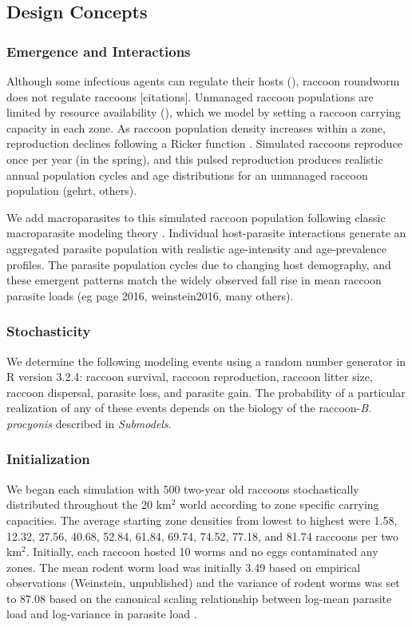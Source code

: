 \documentclass[11pt]{article}
\begin{document}
\subsection{Design Concepts}

\subsubsection{Emergence and Interactions}

Although some infectious agents can regulate their hosts (), raccoon
roundworm does not regulate raccoons [citations]. Unmanaged raccoon populations are
limited by resource availability (), which we model by setting a raccoon
carrying capacity in each zone. As raccoon population density
increases within a zone, reproduction declines following a Ricker function \citep{Gurney1998}. Simulated raccoons
reproduce once per year (in the spring), and this pulsed reproduction
produces realistic annual population cycles and age distributions for an
unmanaged raccoon population (gehrt, others).

We add macroparasites to this simulated raccoon population following
classic macroparasite modeling theory \citep{AndersonandMay1978,Anderson1991,Cornell2010}. Individual host-parasite interactions generate an aggregated
parasite population with realistic age-intensity and age-prevalence
profiles. The parasite population cycles due to
changing host demography, and these emergent patterns match the widely
observed fall rise in mean raccoon parasite loads (eg page 2016,
weinstein2016, many others).

\subsubsection{Stochasticity}

We determine the following modeling events using a random number generator in R version 3.2.4: raccoon survival, raccoon reproduction, raccoon litter size, raccoon dispersal, parasite loss, and parasite gain.  The probability of a particular realization of any of these events depends on the biology of the raccoon-\emph{B. procyonis} described in \emph{Submodels}.

\subsubsection{Initialization}

We began each simulation with 500 two-year old raccoons stochastically
distributed throughout the 20 km$^2$ world according to
zone specific carrying capacities. The average starting zone densities from lowest to highest were 1.58, 12.32, 27.56, 40.68, 52.84, 61.84, 69.74, 74.52, 77.18, and 81.74 raccoons per two km$^2$.
Initially, each raccoon hosted 10 worms and no eggs contaminated any
zones. The mean rodent worm load was initially 3.49 based on
empirical observations (Weinstein, unpublished) and the variance of rodent worms
was set to 87.08 based on the canonical scaling relationship between
log-mean parasite load and log-variance in parasite load \citep{Shaw1995}.
\end{document}
